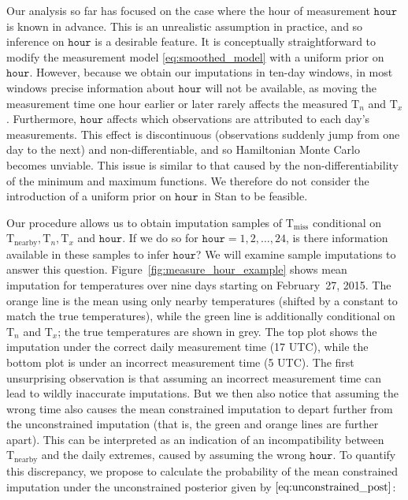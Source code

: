 \documentclass[letter]{article}
\newcommand{\T}{\mathrm{T}}
\newcommand{\Tn}{\T_{n}}
\newcommand{\Tx}{\T_{x}}
\newcommand{\miss}{\mathrm{miss}}
\newcommand{\obs}{\mathrm{nearby}}
\newcommand{\hour}{\mathtt{hour}}
\begin{document}
Our analysis so far has focused on the case where the hour of measurement \(\hour\) is known in advance.
This is an unrealistic assumption in practice, and so inference on \(\hour\) is a desirable feature.
It is conceptually straightforward to modify the measurement model \eqref{eq:smoothed_model} with a uniform prior on \(\hour\).
However, because we obtain our imputations in ten-day windows, in most windows precise information about \(\hour\) will not be available, as moving the measurement time one hour earlier or later rarely affects the measured \(\Tn\) and \(\Tx\).
Furthermore, \(\hour\) affects which observations are attributed to each day's measurements.
This effect is discontinuous (observations suddenly jump from one day to the next) and non-differentiable, and so Hamiltonian Monte Carlo becomes unviable.
This issue is similar to that caused by the non-differentiability of the minimum and maximum functions.
We therefore do not consider the introduction of a uniform prior on \(\hour\) in Stan to be feasible.
    


        Our procedure allows us to obtain imputation samples of \(\T_\miss\) conditional on \(\T_\obs,\Tn,\Tx\) and \(\hour\).
If we do so for \(\hour=1,2,\ldots,24\), is there information available in these samples to infer \(\hour\)?
We will examine sample imputations to answer this question.
Figure~\ref{fig:measure_hour_example} shows mean imputation for temperatures over nine days starting on February~27, 2015. The orange line is the mean using only nearby temperatures (shifted by a constant to match the true temperatures), while the green line is additionally conditional on \(\Tn\) and \(\Tx\); the true temperatures are shown in grey.
The top plot shows the imputation under the correct daily measurement time (17 UTC), while the bottom plot is under an incorrect measurement time (5 UTC).
The first unsurprising observation is that assuming an incorrect measurement time can lead to wildly inaccurate imputations.
But we then also notice that assuming the wrong time also causes the mean constrained imputation to depart further from the unconstrained imputation
(that is, the green and orange lines are further apart).
This can be interpreted as an indication of an incompatibility between \(\T_\obs\) and the daily extremes, caused by assuming the wrong \(\hour\).
To quantify this discrepancy, we propose to calculate the probability of the mean constrained imputation under the unconstrained posterior given by \(\eqref{eq:unconstrained_post}\):
\end{document}
